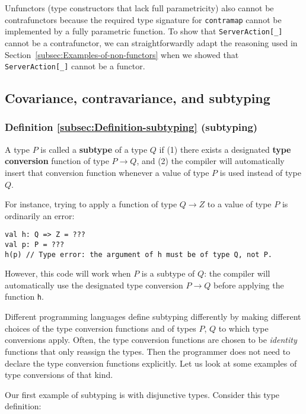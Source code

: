 Unfunctors (type constructors that lack full parametricity)
also cannot be contrafunctors because the required type signature
for \lstinline!contramap! cannot be implemented by a fully parametric
function. To show that \lstinline!ServerAction[_]! cannot be a contrafunctor,
we can straightforwardly adapt the reasoning used in Section~\ref{subsec:Examples-of-non-functors}
when we showed that \lstinline!ServerAction[_]! cannot be a functor.

\subsection{Covariance, contravariance, and subtyping\label{subsec:Covariance,-contravariance,-and-subtyping}}

\subsubsection{Definition \label{subsec:Definition-subtyping}\ref{subsec:Definition-subtyping}
(subtyping)}

A type $P$ is called a \textbf{subtype}
of a type $Q$ if (1) there exists a designated
\textbf{type conversion} function of type $P\rightarrow Q$, and (2)
the compiler will automatically insert that conversion function whenever
a value of type $P$ is used instead of type $Q$. 

For instance, trying to apply a function of type $Q\rightarrow Z$
to a value of type $P$ is ordinarily an error:
\begin{lstlisting}
val h: Q => Z = ???
val p: P = ???
h(p) // Type error: the argument of h must be of type Q, not P.
\end{lstlisting}
However, this code will work when $P$ is a subtype of $Q$: the compiler
will automatically use the designated type conversion $P\rightarrow Q$
before applying the function \lstinline!h!.

Different programming languages define subtyping differently by making
different choices of the type conversion functions and of types $P$,
$Q$ to which type conversions apply. Often, the type conversion functions
are chosen to be \emph{identity} functions that only reassign the
types. Then the programmer does not need to declare the type conversion
functions explicitly. Let us look at some examples of type conversions
of that kind. 

Our first example of subtyping is with disjunctive types. Consider
this type definition:

